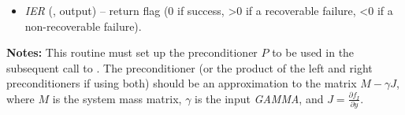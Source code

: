 \documentclass[letterpaper,10pt,english]{sphinxmanual}
\begin{document}
\begin{fulllineitems}
\begin{description}
\begin{itemize}
\item {} 
\emph{IER}  (, output) -- return flag  (0 if success, \textgreater{}0 if a recoverable
failure, \textless{}0 if a non-recoverable failure).

\end{itemize}

\end{description}

\textbf{Notes:}
This routine must set up the preconditioner \(P\) to be used in
the subsequent call to {\hyperref[f_interface/Usage:f/_/FARKPSOL]{\emph{}}}.  The preconditioner (or
the product of the left and right preconditioners if using both)
should be an approximation to the matrix  \(M - \gamma J\),
where \(M\) is the system mass matrix, \(\gamma\) is the
input \emph{GAMMA}, and \(J = \frac{\partial f_I}{\partial y}\).

\end{fulllineitems}

\end{document}
